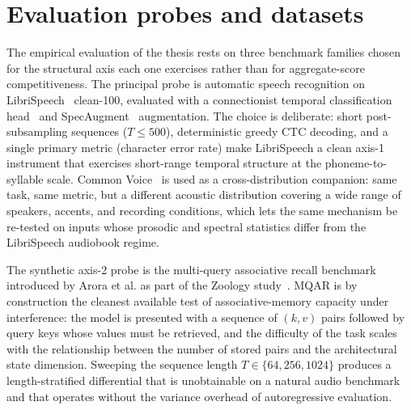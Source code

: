   \section{Evaluation probes and datasets}

  The empirical evaluation of the thesis rests on three benchmark
  families chosen for the structural axis each one exercises rather
  than for aggregate-score competitiveness. The principal probe is
  automatic speech recognition on
  LibriSpeech~\cite{panayotov2015librispeech} clean-100, evaluated
  with a connectionist temporal classification
  head~\cite{graves2006ctc} and SpecAugment~\cite{park2019specaugment}
  augmentation. The choice is deliberate: short post-subsampling
  sequences ($T \le 500$), deterministic greedy CTC decoding, and a
  single primary metric (character error rate) make LibriSpeech a
  clean axis-1 instrument that exercises short-range temporal
  structure at the phoneme-to-syllable scale. Common
  Voice~\cite{ardila2019commonvoice} is used as a cross-distribution
  companion: same task, same metric, but a different acoustic
  distribution covering a wide range of speakers, accents, and
  recording conditions, which lets the same mechanism be re-tested
  on inputs whose prosodic and spectral statistics differ from the
  LibriSpeech audiobook regime.

  The synthetic axis-2 probe is the multi-query associative recall
  benchmark introduced by Arora et al. as part of the Zoology
  study~\cite{arora2023zoology}. MQAR is by construction the
  cleanest available test of associative-memory capacity under
  interference: the model is presented with a sequence of $(k, v)$
  pairs followed by query keys whose values must be retrieved, and
  the difficulty of the task scales with the relationship between
  the number of stored pairs and the architectural state dimension.
  Sweeping the sequence length $T \in \{64, 256, 1024\}$ produces a
  length-stratified differential that is unobtainable on a natural
  audio benchmark and that operates without the variance overhead of
  autoregressive evaluation.

